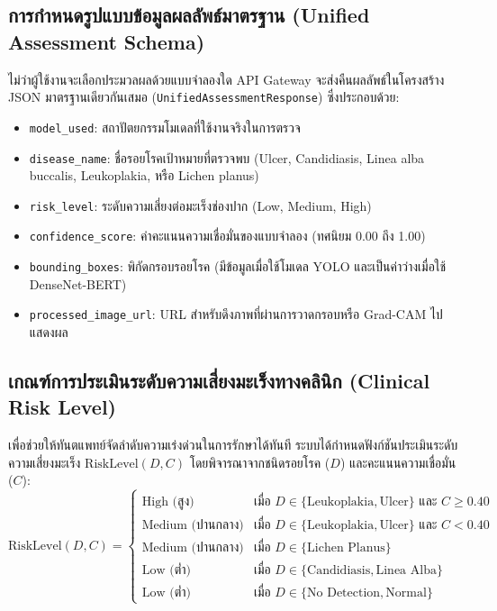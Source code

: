 \subsection{การกำหนดรูปแบบข้อมูลผลลัพธ์มาตรฐาน (Unified Assessment Schema)}
ไม่ว่าผู้ใช้งานจะเลือกประมวลผลด้วยแบบจำลองใด API Gateway จะส่งคืนผลลัพธ์ในโครงสร้าง JSON มาตรฐานเดียวกันเสมอ (\texttt{UnifiedAssessmentResponse}) ซึ่งประกอบด้วย:
\begin{itemize}
    \item \texttt{model\_used}: สถาปัตยกรรมโมเดลที่ใช้งานจริงในการตรวจ
    \item \texttt{disease\_name}: ชื่อรอยโรคเป้าหมายที่ตรวจพบ (Ulcer, Candidiasis, Linea alba buccalis, Leukoplakia, หรือ Lichen planus)
    \item \texttt{risk\_level}: ระดับความเสี่ยงต่อมะเร็งช่องปาก (Low, Medium, High)
    \item \texttt{confidence\_score}: ค่าคะแนนความเชื่อมั่นของแบบจำลอง (ทศนิยม 0.00 ถึง 1.00)
    \item \texttt{bounding\_boxes}: พิกัดกรอบรอยโรค (มีข้อมูลเมื่อใช้โมเดล YOLO และเป็นค่าว่างเมื่อใช้ DenseNet-BERT)
    \item \texttt{processed\_image\_url}: URL สำหรับดึงภาพที่ผ่านการวาดกรอบหรือ Grad-CAM ไปแสดงผล
\end{itemize}

\subsection{เกณฑ์การประเมินระดับความเสี่ยงมะเร็งทางคลินิก (Clinical Risk Level)}
เพื่อช่วยให้ทันตแพทย์จัดลำดับความเร่งด่วนในการรักษาได้ทันที ระบบได้กำหนดฟังก์ชันประเมินระดับความเสี่ยงมะเร็ง $\text{RiskLevel}(D, C)$ โดยพิจารณาจากชนิดรอยโรค ($D$) และคะแนนความเชื่อมั่น ($C$):
\begin{equation}
    \text{RiskLevel}(D, C) = 
    \begin{cases}
        \text{High (สูง)} & \text{เมื่อ } D \in \{\text{Leukoplakia}, \text{Ulcer}\} \text{ และ } C \ge 0.40 \\
        \text{Medium (ปานกลาง)} & \text{เมื่อ } D \in \{\text{Leukoplakia}, \text{Ulcer}\} \text{ และ } C < 0.40 \\
        \text{Medium (ปานกลาง)} & \text{เมื่อ } D \in \{\text{Lichen Planus}\} \\
        \text{Low (ต่ำ)} & \text{เมื่อ } D \in \{\text{Candidiasis}, \text{Linea Alba}\} \\
        \text{Low (ต่ำ)} & \text{เมื่อ } D \in \{\text{No Detection}, \text{Normal}\}
    \end{cases}
    \label{eq:ch3_risk_level}
\end{equation}

